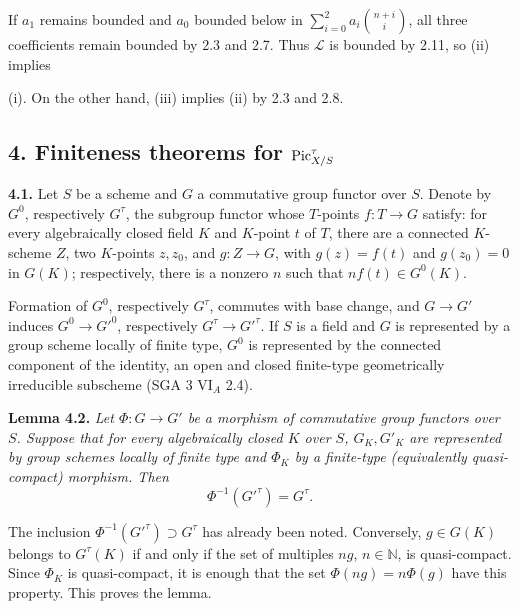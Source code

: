 If \(a_1\) remains bounded and \(a_0\) bounded below in
\(\sum_{i=0}^{2}a_i\binom{n+i}{i}\), all three coefficients remain
bounded by 2.3 and 2.7. Thus \(\mathscr L\) is bounded by 2.11, so (ii)
implies

(i). On the other hand, (iii) implies (ii) by 2.3 and 2.8.

\subsection*{4. Finiteness theorems for \(\operatorname{Pic}^\tau_{X/S}\)}

\textbf{4.1.} Let \(S\) be a scheme and \(G\) a commutative group functor
over \(S\). Denote by \(G^0\), respectively \(G^\tau\), the subgroup
functor whose \(T\)-points \(f:T\to G\) satisfy: for every algebraically
closed field \(K\) and \(K\)-point \(t\) of \(T\), there are a connected
\(K\)-scheme \(Z\), two \(K\)-points \(z,z_0\), and \(g:Z\to G\), with
\(g(z)=f(t)\) and \(g(z_0)=0\) in \(G(K)\); respectively, there is a
nonzero \(n\) such that \(nf(t)\in G^0(K)\).

Formation of \(G^0\), respectively \(G^\tau\), commutes with base change,
and \(G\to G'\) induces \(G^0\to G'^0\), respectively
\(G^\tau\to G'^\tau\). If \(S\) is a field and \(G\) is represented by a
group scheme locally of finite type, \(G^0\) is represented by the
connected component of the identity, an open and closed finite-type
geometrically irreducible subscheme (SGA 3 VI\(_A\) 2.4).

\textbf{Lemma 4.2.} \emph{Let \(\Phi:G\to G'\) be a morphism of
commutative group functors over \(S\). Suppose that for every
algebraically closed \(K\) over \(S\), \(G_K,G'_K\) are represented by
group schemes locally of finite type and \(\Phi_K\) by a finite-type
(equivalently quasi-compact) morphism. Then}
\[
\Phi^{-1}(G'^\tau)=G^\tau.
\]

The inclusion \(\Phi^{-1}(G'^\tau)\supset G^\tau\) has already been
noted. Conversely, \(g\in G(K)\) belongs to \(G^\tau(K)\) if and only if
the set of multiples \(ng\), \(n\in\mathbb N\), is quasi-compact. Since
\(\Phi_K\) is quasi-compact, it is enough that the set
\(\Phi(ng)=n\Phi(g)\) have this property. This proves the lemma.

